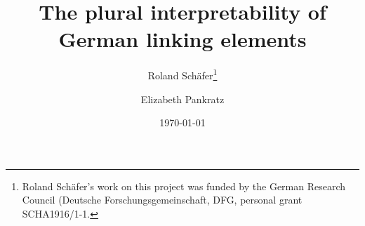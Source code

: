 \usepackage[margin=4cm]{geometry}

\usepackage{authblk}
\author[1]{Roland Schäfer\thanks{Roland Schäfer's work on this project was funded by the German Research Council (Deutsche Forschungsgemeinschaft, DFG, personal grant SCHA1916/1-1.}}
\author[2]{Elizabeth Pankratz}

\title{The plural interpretability of German linking elements}
\date{\today}

\newenvironment{acknowledgements}{\section*{Acknowledgements}}{}
\newenvironment{ethicalstandards}{\section*{Compliance with ethical standards}}{}
\newcommand{\keywords}[1]{}

\usepackage[printwatermark]{xwatermark}
